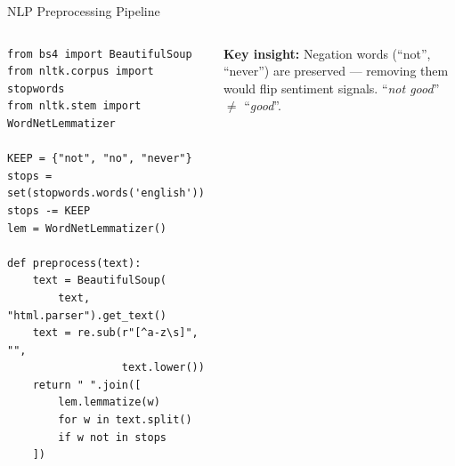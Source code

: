 \documentclass[aspectratio=169,10pt]{beamer}
\begin{document}
\begin{frame}[fragile]{NLP Preprocessing Pipeline}
\begin{columns}[T]
  \begin{tcolorbox}[codebox]
  \begin{lstlisting}[style=py, numbers=none]
from bs4 import BeautifulSoup
from nltk.corpus import stopwords
from nltk.stem import WordNetLemmatizer

KEEP = {"not", "no", "never"}
stops = set(stopwords.words('english'))
stops -= KEEP
lem = WordNetLemmatizer()

def preprocess(text):
    text = BeautifulSoup(
        text, "html.parser").get_text()
    text = re.sub(r"[^a-z\s]", "",
                  text.lower())
    return " ".join([
        lem.lemmatize(w)
        for w in text.split()
        if w not in stops
    ])
  \end{lstlisting}
  \end{tcolorbox}

  \vspace{0.15cm}
  \begin{tcolorbox}[enhanced,colback=pgreenlt,colframe=pgreen,
      boxrule=0pt,leftrule=3pt,arc=2pt,
      top=3pt,bottom=3pt,left=6pt,right=6pt]
    \tiny\textbf{Key insight:} Negation words (``not'', ``never'') are
    preserved --- removing them would flip sentiment signals.
    ``\textit{not good}'' $\neq$ ``\textit{good}''.
  \end{tcolorbox}
\end{columns}
\end{frame}
\end{document}
